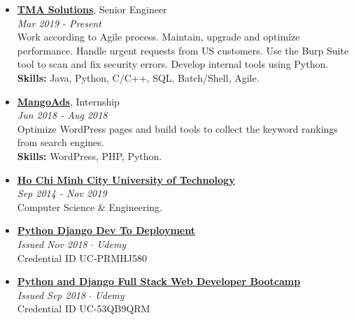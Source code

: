 \documentclass[12pt,a4paper]{article}
\begin{document}
	
	\begin{itemize}
		\item {
			\textbf{\href{https://www.tmasolutions.com/}{TMA Solutions}}, Senior Engineer \\
			\small{\textit{\color{gray}Mar 2019 - Present}} \\
			\small{Work according to Agile process.
				Maintain, upgrade and optimize performance. Handle urgent requests from US customers.
				Use the Burp Suite tool to scan and fix security errors. Develop internal tools using Python.} \\
			\textbf{Skills:} Java, Python, C/C++, SQL, Batch/Shell, Agile.
		}
		
		\item {
			\textbf{\href{https://mangoads.vn}{MangoAds}}, Internship \\
			\small{\textit{\color{gray}Jun 2018 - Aug 2018}} \\
			\small{Optimize WordPress pages and build tools to collect the keyword rankings from search engines.} \\
			\textbf{Skills:} WordPress, PHP, Python.
		}
	\end{itemize}
	
	\begin{itemize}
		\item {
			\textbf{\href{https://hcmut.edu.vn}{Ho Chi Minh City University of Technology}} \\
			\small{\textit{\color{gray}Sep 2014 - Nov 2019}} \\
			\small{Computer Science \& Engineering.}
		}
	\end{itemize}
	
	\begin{itemize}
		\item {
			\textbf{\href{https://www.udemy.com/certificate/UC-PRMHJ580}{Python Django Dev To Deployment}} \\
			\small{\textit{\color{gray}Issued Nov 2018 $\cdot$ Udemy}} \\
			\small{Credential ID UC-PRMHJ580}
		}
		
		\item {
			\textbf{\href{https://www.udemy.com/certificate/UC-53QB9QRM}{Python and Django Full Stack Web Developer Bootcamp}} \\
			\small{\textit{\color{gray}Issued Sep 2018 $\cdot$ Udemy}} \\
			\small{Credential ID UC-53QB9QRM}
		}
	\end{itemize}
	
\end{document}
